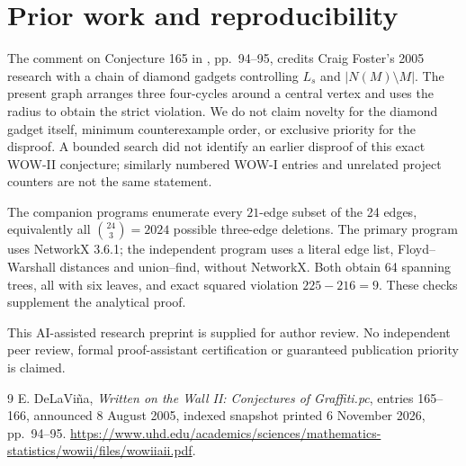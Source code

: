 \documentclass[11pt,a4paper]{article}
\begin{document}
\section{Prior work and reproducibility}
The comment on Conjecture 165 in \cite{wow}, pp.~94--95, credits Craig Foster's 2005 research with a chain of diamond gadgets controlling $L_s$ and $|N(M)\setminus M|$. The present graph arranges three four-cycles around a central vertex and uses the radius to obtain the strict violation. We do not claim novelty for the diamond gadget itself, minimum counterexample order, or exclusive priority for the disproof. A bounded search did not identify an earlier disproof of this exact WOW-II conjecture; similarly numbered WOW-I entries and unrelated project counters are not the same statement.

The companion programs enumerate every $21$-edge subset of the 24 edges, equivalently all $\binom{24}{3}=2024$ possible three-edge deletions. The primary program uses NetworkX 3.6.1; the independent program uses a literal edge list, Floyd--Warshall distances and union--find, without NetworkX. Both obtain 64 spanning trees, all with six leaves, and exact squared violation $225-216=9$. These checks supplement the analytical proof.

This AI-assisted research preprint is supplied for author review. No independent peer review, formal proof-assistant certification or guaranteed publication priority is claimed.
\begin{thebibliography}{9}
 E. DeLaVi\~na, \emph{Written on the Wall II: Conjectures of Graffiti.pc}, entries 165--166, announced 8 August 2005, indexed snapshot printed 6 November 2026, pp.~94--95. \url{https://www.uhd.edu/academics/sciences/mathematics-statistics/wowii/files/wowiiaii.pdf}.
\end{thebibliography}
\end{document}
